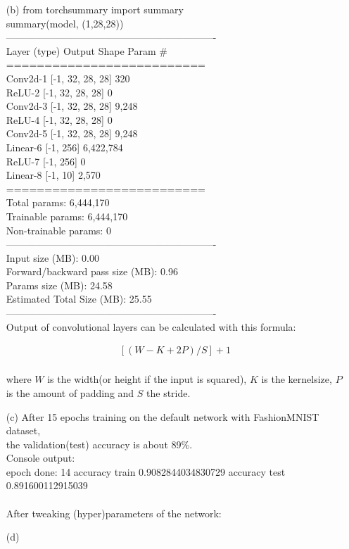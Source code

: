 \documentclass [a4paper, 11pt] {article}
\begin{document}
\begin{enumerate}
\item[(b)]
from torchsummary import summary\\
summary(model, (1,28,28))\\
----------------------------------------------------------------\\
Layer (type)               Output Shape         Param \#\\
==========================\\
Conv2d-1           [-1, 32, 28, 28]             320\\
ReLU-2           [-1, 32, 28, 28]               0\\
Conv2d-3           [-1, 32, 28, 28]           9,248\\
ReLU-4           [-1, 32, 28, 28]               0\\
Conv2d-5           [-1, 32, 28, 28]           9,248\\
Linear-6                  [-1, 256]       6,422,784\\
ReLU-7                  [-1, 256]               0\\
Linear-8                   [-1, 10]           2,570\\
==========================\\
Total params: 6,444,170\\
Trainable params: 6,444,170\\
Non-trainable params: 0\\
----------------------------------------------------------------\\
Input size (MB): 0.00\\
Forward/backward pass size (MB): 0.96\\
Params size (MB): 24.58\\
Estimated Total Size (MB): 25.55\\
----------------------------------------------------------------\\

Output of convolutional layers can be calculated with this formula: 

\begin{align*}
\left[(W-K+2P)/S\right]+1 \\
\end{align*}

where $W$ is the width(or height if the input is squared), $K$ is the kernelsize, $P$ is the amount of padding and $S$ the stride.

\item[(c)]
After 15 epochs training on the default network with FashionMNIST dataset, \\
the validation(test) accuracy is about 89\%.\\
Console output:\\
epoch done:  14
accuracy train 0.9082844034830729
accuracy test 0.891600112915039\\
\\
After tweaking (hyper)parameters of the network: 
\item[(d)]

\end{enumerate}
	
\end{document}
